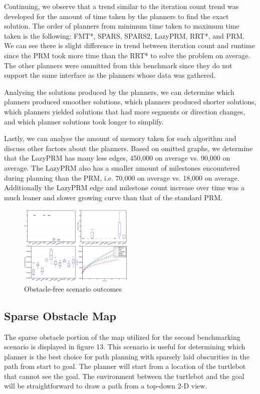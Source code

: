 \documentclass[conference]{IEEEtran} \usepackage[T1]{fontenc} \usepackage[backend=biber, style=ieee]{biblatex}
\begin{document}
Continuing, we observe that a trend similar to the iteration count trend was developed for the amount of time taken by the planners to find the exact solution. 
The order of planners from minimum time taken to maximum time taken is the following: FMT*, SPARS, SPARS2, LazyPRM, RRT*, and PRM. We can see there is slight 
difference in trend between iteration count and runtime since the PRM took more time than the RRT* to solve the problem on average. The other planners were ommitted from
this benchmark since they do not support the same interface as the planners whose data was gathered.

Analysing the solutions produced by the planners, we can determine which planners produced smoother solutions, which planners produced shorter solutions, which
planners yielded solutions that had more segments or direction changes, and which planner solutions took longer to simplify.

Lastly, we can analyse the amount of memory taken for each algorithm and discuss other factors about the planners. Based on omitted graphs, we determine that the
LazyPRM has many less edges, 450,000 on average vs. 90,000 on average. The LazyPRM also has a smaller amount of milestones encountered during planning than the
PRM, i.e. 70,000 on average vs. 18,000 on average. Additionally the LazyPRM edge and milestone count increase over time was a much leaner and slower growing
curve than that of the standard PRM.

\begin{figure}
\label{figure12} 
\centering 
\includegraphics[width=0.49\textwidth]{s1_outcomes}
\caption{Obstacle-free scenario outcomes}
\end{figure}

\subsection{Sparse Obstacle Map} \label{Sparse Obstacle Map}

The sparse obstacle portion of the map utilized for the second benchmarking scenario is displayed in figure 13. This scenario is useful for determining which planner is 
the best choice for path planning with sparsely laid obscurities in the path from start to goal. The planner will start from a location of the turtlebot that cannot see
the goal. The environment between the turtlebot and the goal will be straightforward to draw a path from a top-down 2-D view.
\end{document}
